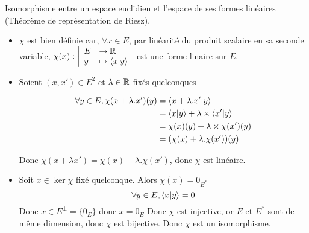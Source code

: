 \documentclass{article}
\renewenvironment{question_kholle}[2][ ]
{
	\subsection{\texorpdfstring{#2}{}}
	\notblank{#1}
	{
		\noindent #1
		\bigbreak
	}
	{}
	\begin{proof}
}
{
	\end{proof}
}
\begin{document}
\begin{question_kholle}{Isomorphisme entre un espace euclidien et l'espace de ses formes linéaires (Théorème de représentation de Riesz).}
	\begin{itemize}[label=$\star$]
		\item $\chi$ est bien définie car, $\forall x \in E$, par linéarité du produit scalaire en sa seconde variable, $\chi(x): \left|\begin{array}{ll} E &\to \mathbb R \\ y &\mapsto \braket{ x | y }  \end{array}\right.$ est une forme linaire sur $E$.
		
		
		\item Soient $(x, x') \in E^{2}$ et $\lambda \in \mathbb R$ fixés quelconques
		
		
		\begin{align*}
			\forall y \in E,  \chi(x + \lambda .x')(y) &= \braket{ x+\lambda.x' | y }  \\
			&= \braket{ x | y } + \lambda \times\braket{ x' | y }  \\ 
			&= \chi(x)(y) + \lambda \times \chi(x')(y) \\
			&= (\chi(x) + \lambda . \chi(x') )(y)
		\end{align*}
		
		Donc $\chi(x+\lambda x') = \chi(x) + \lambda.\chi(x')$, donc $\chi$ est linéaire.
		
		\item Soit $x \in \ker \chi$ fixé quelconque.
		Alors $\chi (x) = 0_{E^{*}}$
		$$\forall y \in E, \braket{ x | y } = 0$$
		Donc $x \in E^{\perp} = \{ 0_{E} \}$ donc $x = 0_{E}$
		Donc $\chi$ est injective, or $E$ et $E^{*}$ sont de même dimension, donc $\chi$ est bijective.
		Donc $\chi$ est un isomorphisme.
	\end{itemize}
\end{question_kholle}
\end{document}
